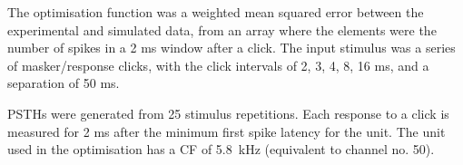 The optimisation function was a weighted mean squared error between
the experimental and simulated data, from an array where the elements
were the number of spikes in a 2 ms window after a click.  The input
stimulus was a series of masker/response clicks, with the click
intervals of 2, 3, 4, 8, 16 ms, and a separation of 50 ms.


 PSTHs were generated from 25
   stimulus repetitions. Each response to a click is measured for 2 ms
   after the minimum first spike latency for the unit.  The unit  used
   in the optimisation has a CF of 5.8~kHz (equivalent to channel no. 50).





 \newpage
%





\clearpage


